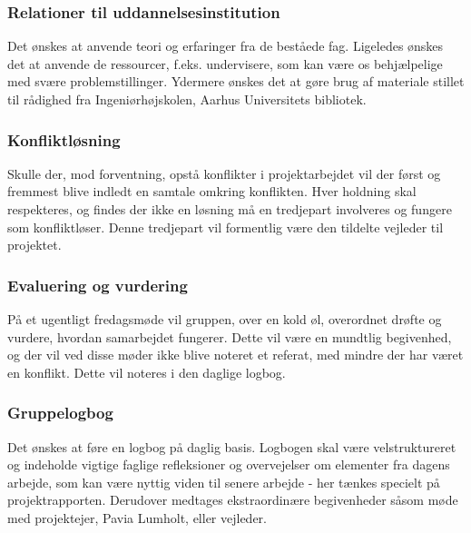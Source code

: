 \subsubsection{Relationer til uddannelsesinstitution}
Det ønskes at anvende teori og erfaringer fra de beståede fag. Ligeledes ønskes det at anvende de ressourcer, f.eks. undervisere, som kan være os behjælpelige med svære problemstillinger. Ydermere ønskes det at gøre brug af materiale stillet til rådighed fra Ingeniørhøjskolen, Aarhus Universitets bibliotek. 

\subsubsection{Konfliktløsning}
Skulle der, mod forventning, opstå konflikter i projektarbejdet vil der først og fremmest blive indledt en samtale omkring konflikten. Hver holdning skal respekteres, og findes der ikke en løsning må en tredjepart involveres og fungere som konfliktløser. Denne tredjepart vil formentlig være den tildelte vejleder til projektet.   

\subsubsection{Evaluering og vurdering}
På et ugentligt fredagsmøde vil gruppen, over en kold øl, overordnet drøfte og vurdere, hvordan samarbejdet fungerer. Dette vil være en mundtlig begivenhed, og der vil ved disse møder ikke blive noteret et referat, med mindre der har været en konflikt. Dette vil noteres i den daglige logbog.

\subsubsection{Gruppelogbog} 
Det ønskes at føre en logbog på daglig basis. Logbogen skal være velstruktureret og  indeholde vigtige faglige refleksioner og overvejelser om elementer fra dagens arbejde, som kan være nyttig viden til senere arbejde - her tænkes specielt på projektrapporten. Derudover medtages ekstraordinære begivenheder såsom møde med projektejer, Pavia Lumholt, eller vejleder.     




